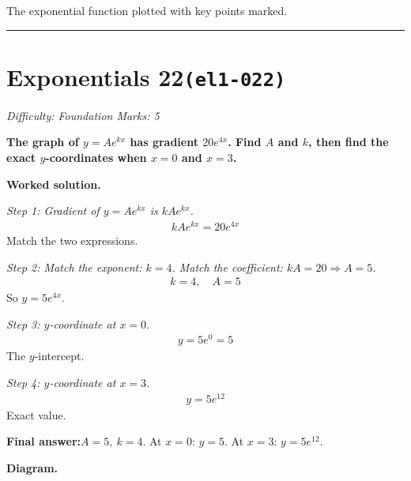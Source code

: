 \documentclass[11pt]{article}
\newcommand{\question}[1]{\par\medskip\noindent\textbf{#1}\par}
\begin{document}
\begin{center}
{
}
\end{center}
\small The exponential function plotted with key points marked.\normalsize

\medskip\hrule

\section*{Exponentials 22\quad\small\texttt{(el1-022)}}
\textit{Difficulty: Foundation \quad\textbar\quad Marks: 5}

\question{The graph of \( y = Ae^{kx} \) has gradient \( 20e^{4x} \). Find \( A \) and \( k \), then find the exact \( y \)-coordinates when \( x = 0 \) and \( x = 3 \).}

\textbf{Worked solution.}

\textit{Step 1: Gradient of \( y = Ae^{kx} \) is \( kAe^{kx} \).}
\[\begin{gathered}
kAe^{kx} = 20e^{4x}
\end{gathered}\]
Match the two expressions.

\textit{Step 2: Match the exponent: \( k = 4 \). Match the coefficient: \( kA = 20 \Rightarrow A = 5 \).}
\[\begin{gathered}
k = 4, \quad A = 5
\end{gathered}\]
So \( y = 5e^{4x} \).

\textit{Step 3: \( y \)-coordinate at \( x = 0 \).}
\[\begin{gathered}
y = 5e^0 = 5
\end{gathered}\]
The \( y \)-intercept.

\textit{Step 4: \( y \)-coordinate at \( x = 3 \).}
\[\begin{gathered}
y = 5e^{12}
\end{gathered}\]
Exact value.

\begin{answerbox}
\textbf{Final answer:}\quad \(\displaystyle  A = 5,\ k = 4 \). At \(\displaystyle  x = 0 \): \(\displaystyle  y = 5 \). At \(\displaystyle  x = 3 \): \(\displaystyle  y = 5e^{12} \).
\end{answerbox}
\textbf{Diagram.}
\end{document}
